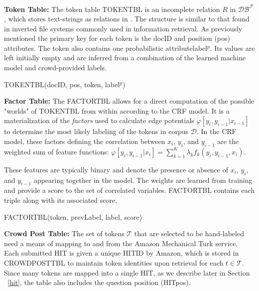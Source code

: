 \noindent\textbf{Token Table:} The token table T{\small OKEN}T{\small BL} is an incomplete relation $R$ in $\mathcal{DB^{P}}$, which stores text-strings as relations in \sysName .  The structure is similar to that found in inverted file systems commonly used in information retrieval.  As previously mentioned the primary key for each token is the docID and position (pos) attributes.  The token also contains one probabilistic attribute\textemdash label$^{p}$.  Its values are left initially empty and are inferred from a combination of the learned machine model and crowd-provided labels.

\vspace{.1in}
\centerline{T{\small OKEN}T{\small BL}(docID, pos, token, label$^{p}$)}
\vspace{.1in}

\noindent\textbf{Factor Table:} The F{\small ACTOR}T{\small BL} allows for a direct computation of the possible "worlds" of T{\small OKEN}T{\small BL} from within \sysName according to the CRF model.  It is a materialization of the \emph{factors} used to calculate edge potentials $\varphi[y_{i},y_{i-1}|x_{i-1}]$ to determine the most likely labeling of the tokens in corpus $\mathcal{D}$.  In the CRF model, these factors defining the correlation between $x_{i}$, $y_{i}$, and $y_{i-1}$ are the weighted sum of feature functions: $\varphi[y_{i},y_{i-1}|x_{i}] = \sum^{K}_{k=1}\lambda_{k}f_{k}(y_{i},y_{i-1},x_{i})$.

These features are typically binary and denote the presence or absence of $x_{i}$, $y_{i}$, and $y_{i-1}$ appearing together in the model.  The weights are learned from training and provide a score to the set of correlated variables.  F{\small ACTOR}T{\small BL} contains each triple along with its associated score.

\vspace{.1in}
\centerline{F{\small ACTOR}T{\small BL}(token, prevLabel, label, score)}
\vspace{.1in}

\noindent\textbf{Crowd Post Table:} The set of tokens $\mathcal{T}$ that are selected to be hand-labeled need a means of mapping to and from the Amazon Mechanical Turk service.  Each submitted HIT is given a unique HITID by Amazon, which is stored in C{\small ROWD}P{\small OST}T{\small BL} to maintain token identities upon retrieval for each $t\in\mathcal{T}$.  Since many tokens are mapped into a single HIT, as we describe later in Section ~\ref{hit}, the table also includes the question position (HITpos).
 

